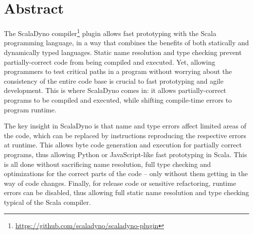 \section{Abstract}





The ScalaDyno compiler\footnote{\url{https://github.com/scaladyno/scaladyno-plugin}} plugin allows fast prototyping with the Scala programming language, in a way that combines the benefits of both statically and dynamically typed languages. Static name resolution and type checking prevent partially-correct code from being compiled and executed. Yet, allowing programmers to test critical paths in a program without worrying about the consistency of the entire code base is crucial to fast prototyping and agile development. This is where ScalaDyno comes in: it allows partially-correct programs to be compiled and executed, while shifting compile-time errors to program runtime.

The key insight in ScalaDyno is that name and type errors affect limited areas of the code, which can be replaced by instructions reproducing the respective errors at runtime. This allows byte code generation and execution for partially correct programs, thus allowing Python or JavaScript-like fast prototyping in Scala. This is all done without sacrificing name resolution, full type checking and optimizations for the correct parts of the code -- only without them getting in the way of code changes. Finally, for release code or sensitive refactoring, runtime errors can be disabled, thus allowing full static name resolution and type checking typical of the Scala compiler.



